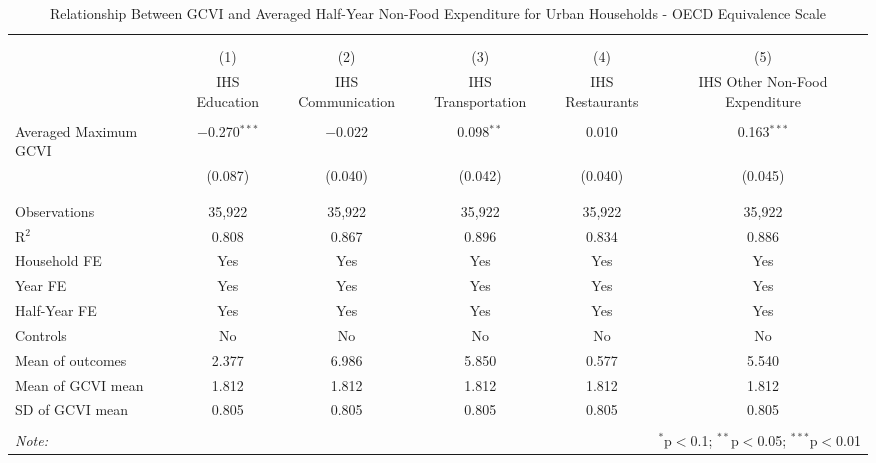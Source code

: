 
\begin{table}[!htbp] \centering 
  \caption{Relationship Between GCVI and Averaged Half-Year Non-Food Expenditure for Urban Households - OECD Equivalence Scale} 
  \label{gcvi_table_7_2_urban.tex} 
\normalsize 
\begin{tabular}{@{\extracolsep{5pt}}lccccc} 
\\[-1.8ex]\hline 
\hline \\[-1.8ex] 
\\[-1.8ex] & (1) & (2) & (3) & (4) & (5)\\ 
 & IHS Education & IHS Communication & IHS Transportation & IHS Restaurants & IHS Other Non-Food Expenditure \\ 
\hline \\[-1.8ex] 
 Averaged Maximum GCVI & $-$0.270$^{***}$ & $-$0.022 & 0.098$^{**}$ & 0.010 & 0.163$^{***}$ \\ 
  & (0.087) & (0.040) & (0.042) & (0.040) & (0.045) \\ 
  & & & & & \\ 
\hline \\[-1.8ex] 
Observations & 35,922 & 35,922 & 35,922 & 35,922 & 35,922 \\ 
R$^{2}$ & 0.808 & 0.867 & 0.896 & 0.834 & 0.886 \\ 
Household FE & Yes & Yes & Yes & Yes & Yes \\ 
Year FE & Yes & Yes & Yes & Yes & Yes \\ 
Half-Year FE & Yes & Yes & Yes & Yes & Yes \\ 
Controls & No & No & No & No & No \\ 
Mean of outcomes & 2.377 & 6.986 & 5.850 & 0.577 & 5.540 \\ 
Mean of GCVI mean & 1.812 & 1.812 & 1.812 & 1.812 & 1.812 \\ 
SD of GCVI mean & 0.805 & 0.805 & 0.805 & 0.805 & 0.805 \\ 
\hline \\[-1.8ex] 
\textit{Note:}  & \multicolumn{5}{r}{$^{*}$p$<$0.1; $^{**}$p$<$0.05; $^{***}$p$<$0.01} \\ 
\end{tabular} 
\end{table} 
